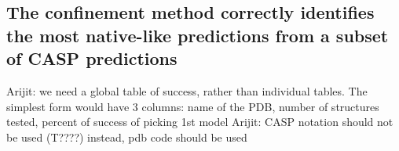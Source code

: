 \documentclass[12pt]{article}
\newcommand{\Alberto}[1]{\color{ForestGreen}#1\normalcolor }
\newcommand{\Justin}[1]{\color{blue}#1\normalcolor}
\begin{document}


\subsection{The confinement method correctly identifies the most native-like predictions from a
subset of CASP predictions}
\Alberto{Arijit: we need a global table of success, rather than individual tables. The simplest form
    would have 3 columns: name of the PDB, number of structures tested, percent of success of
    picking 1st model}
\Alberto{Arijit: CASP notation should not be used (T????) instead, pdb code should be used}
\end{document}
